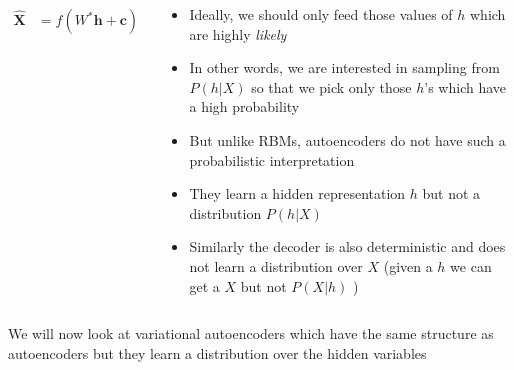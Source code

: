 \begin{frame}
	\begin{columns}
		\begin{overlayarea}{\textwidth}{\textheight}
			\vspace{3pt}
			
			\vspace{30pt}
			\begin{align*}
				\mathbf{\hat{X}} &= f(W^*\mathbf{h} +\mathbf{c})      
			\end{align*}
		\end{overlayarea}
		\begin{overlayarea}{\textwidth}{\textheight}
			\begin{itemize}\justifying
				\item<1-> Ideally, we should only feed those values of $h$ which are highly \textit{likely} 
				\item<2-> In other words, we are interested in sampling from $P(h|X)$ so that we pick only those $h$'s which have a high probability
				\item<3-> But unlike RBMs, autoencoders do not have such a probabilistic interpretation
				\item<4-> They learn a hidden representation $h$ but not a distribution $P(h|X)$
				\item<5-> Similarly the decoder is also deterministic and does not learn a distribution over $X$ (given a $h$ we can get a $X$ but not $P(X|h)$ )
			\end{itemize}
		\end{overlayarea}
	\end{columns}
\end{frame}

\begin{frame}
	\begin{block}{}
		We will now look at variational autoencoders which have the same structure as autoencoders but they learn a distribution over the hidden variables
	\end{block}
\end{frame}
